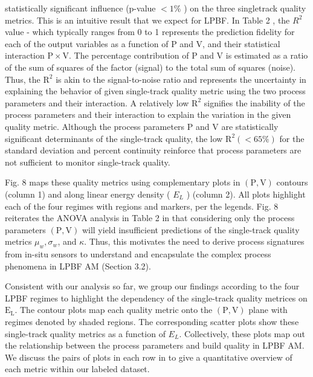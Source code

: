 \documentclass[10pt]{article}
\begin{document}
statistically significant influence (p-value $<1 \%$ ) on the three singletrack quality metrics. This is an intuitive result that we expect for LPBF. In Table 2 , the $R^{2}$ value - which typically ranges from 0 to 1 represents the prediction fidelity for each of the output variables as a function of $\mathrm{P}$ and $\mathrm{V}$, and their statistical interaction $\mathrm{P} \times \mathrm{V}$. The percentage contribution of $\mathrm{P}$ and $\mathrm{V}$ is estimated as a ratio of the sum of squares of the factor (signal) to the total sum of squares (noise). Thus, the $\mathrm{R}^{2}$ is akin to the signal-to-noise ratio and represents the uncertainty in explaining the behavior of given single-track quality metric using the two process parameters and their interaction. A relatively low $\mathrm{R}^{2}$ signifies the inability of the process parameters and their interaction to explain the variation in the given quality metric. Although the process parameters $\mathrm{P}$ and $\mathrm{V}$ are statistically significant determinants of the single-track quality, the low $\mathrm{R}^{2}(<65 \%)$ for the standard deviation and percent continuity reinforce that process parameters are not sufficient to monitor single-track quality.

Fig. 8 maps these quality metrics using complementary plots in $(\mathrm{P}, \mathrm{V})$ contours (column 1) and along linear energy density ( $E_{L}$ ) (column 2). All plots highlight each of the four regimes with regions and markers, per the legends. Fig. 8 reiterates the ANOVA analysis in Table 2 in that considering only the process parameters $(\mathrm{P}, \mathrm{V})$ will yield insufficient predictions of the single-track quality metrics $\mu_{w}, \sigma_{w}$, and $\kappa$. Thus, this motivates the need to derive process signatures from in-situ sensors to understand and encapsulate the complex process phenomena in LPBF AM (Section 3.2).

Consistent with our analysis so far, we group our findings according to the four LPBF regimes to highlight the dependency of the single-track quality metrices on $\mathrm{E}_{\mathrm{L}}$. The contour plots map each quality metric onto the $(\mathrm{P}, \mathrm{V})$ plane with regimes denoted by shaded regions. The corresponding scatter plots show these single-track quality metrics as a function of $E_{L}$. Collectively, these plots map out the relationship between the process parameters and build quality in LPBF AM. We discuss the pairs of plots in each row in to give a quantitative overview of each metric within our labeled dataset.
\end{document}
